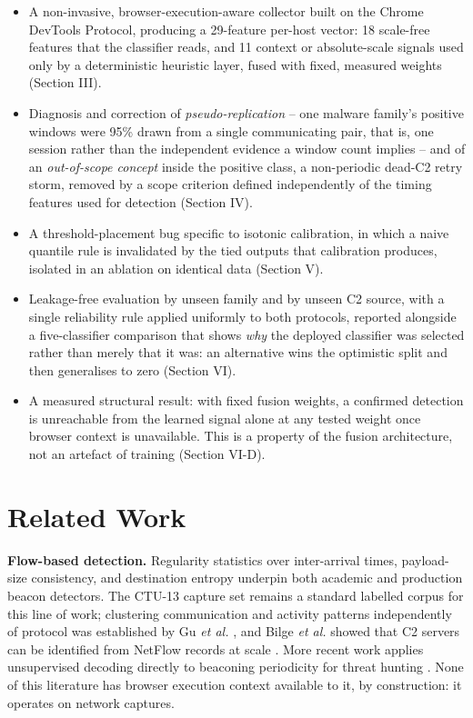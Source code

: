 \documentclass[conference,a4paper]{IEEEtran}
\begin{document}
\begin{itemize}
\item A non-invasive, browser-execution-aware collector built on the Chrome DevTools Protocol, producing a 29-feature per-host vector: 18 scale-free features that the classifier reads, and 11 context or absolute-scale signals used only by a deterministic heuristic layer, fused with fixed, measured weights (Section III).
\item Diagnosis and correction of \emph{pseudo-replication} -- one malware family's positive windows were 95\% drawn from a single communicating pair, that is, one session rather than the independent evidence a window count implies -- and of an \emph{out-of-scope concept} inside the positive class, a non-periodic dead-C2 retry storm, removed by a scope criterion defined independently of the timing features used for detection (Section IV).
\item A threshold-placement bug specific to isotonic calibration, in which a naive quantile rule is invalidated by the tied outputs that calibration produces, isolated in an ablation on identical data (Section V).
\item Leakage-free evaluation by unseen family and by unseen C2 source, with a single reliability rule applied uniformly to both protocols, reported alongside a five-classifier comparison that shows \emph{why} the deployed classifier was selected rather than merely that it was: an alternative wins the optimistic split and then generalises to zero (Section VI).
\item A measured structural result: with fixed fusion weights, a confirmed detection is unreachable from the learned signal alone at any tested weight once browser context is unavailable. This is a property of the fusion architecture, not an artefact of training (Section VI-D).
\end{itemize}

\section{Related Work}

\textbf{Flow-based detection.} Regularity statistics over inter-arrival times, payload-size consistency, and destination entropy underpin both academic and production beacon detectors. The CTU-13 capture set \cite{garcia2014ctu13} remains a standard labelled corpus for this line of work; clustering communication and activity patterns independently of protocol was established by Gu \emph{et al.} \cite{gu2008botminer}, and Bilge \emph{et al.} showed that C2 servers can be identified from NetFlow records at scale \cite{bilge2012disclosure}. More recent work applies unsupervised decoding directly to beaconing periodicity for threat hunting \cite{mahboubi2025lurking}. None of this literature has browser execution context available to it, by construction: it operates on network captures.
\end{document}
